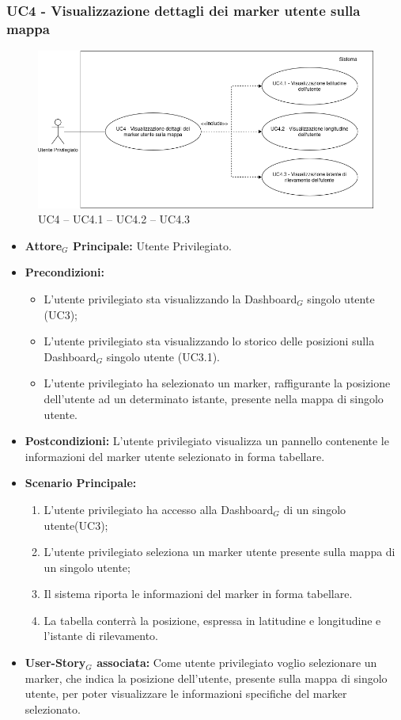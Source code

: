 \documentclass[11pt]{article}
\begin{document}
\begin{justify}
\subsubsection{\textbf{UC4 - Visualizzazione dettagli dei marker utente sulla mappa}}
\begin{figure}[H]
    \centering
    \includegraphics[width=0.7\linewidth]{UC4image.png}
    \caption{UC4 -- UC4.1 -- UC4.2 -- UC4.3}
    \label{fig:UC4}
\end{figure}
\label{UC4}
\begin{itemize}
     \item \textbf{Attore$_G$ Principale:} Utente Privilegiato.
     \item \textbf{Precondizioni:}
        \begin{itemize}
    		\item L'utente privilegiato sta visualizzando la Dashboard$_G$ singolo utente (UC3);
    		\item L'utente privilegiato sta visualizzando lo storico delle posizioni sulla Dashboard$_G$ singolo utente (UC3.1).
          \item L'utente privilegiato ha selezionato un marker, raffigurante la posizione dell'utente ad un determinato istante, presente nella mappa di singolo utente.
        \end{itemize}
      \item \textbf{Postcondizioni:} L'utente privilegiato visualizza un pannello contenente le informazioni del marker utente selezionato in forma tabellare. 
      \item \textbf{Scenario Principale:}
        \begin{enumerate}
            \item L'utente privilegiato ha accesso alla Dashboard$_G$ di un singolo utente(UC3);
            \item L'utente privilegiato seleziona un marker utente presente sulla mappa di un singolo utente;
            \item Il sistema riporta le informazioni del marker in forma tabellare.
            \item La tabella conterrà la posizione, espressa in latitudine e longitudine e l'istante di rilevamento.
        \end{enumerate}
     \item \textbf{User-Story$_G$ associata:}
       Come utente privilegiato voglio selezionare un marker, che indica la posizione dell'utente, presente sulla mappa di singolo utente, per poter visualizzare le informazioni specifiche del marker selezionato.
\end{itemize}


\end{justify}
\end{document}
